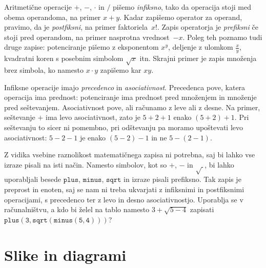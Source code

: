 Aritmetične operacije $+$, $-$, $\cdot$ in $/$ pišemo \emph{infiksno}, tako da operacija
stoji med obema operandoma, na primer $x + y$. Kadar zapišemo operator za operand,
pravimo, da je \emph{postfiksni}, na primer faktoriela~$x!$. Zapis operatorja je
\emph{prefiksni} če stoji pred operandom, na primer nasprotna vrednost~$-x$. Poleg teh
poznamo tudi druge zapise: potenciranje pišemo z eksponentom $x^y$, deljenje z ulomkom
$\frac{x}{y}$, kvadratni koren s posebnim simbolom $\sqrt{x}$ itn. Skrajni primer je zapis
množenja brez simbola, ko namesto $x \cdot y$ zapišemo kar $x y$. 

Infiksne operacije imajo \emph{precedenco} in \emph{asociativnost}. Precedenca pove,
katera operacija ima prednost: potenciranje ima prednost pred množenjem in množenje pred
seštevanjem. Asociativnost pove, ali računamo z leve ali z desne. Na primer, seštevanje
$+$ ima levo asociativnost, zato je $5 + 2 + 1$ enako $(5 + 2) + 1$. Pri seštevanju to
sicer ni pomembno, pri odštevanju pa moramo upoštevati levo asociativnost: $5 - 2 - 1$ je
enako $(5 - 2) - 1$ in ne $5 - (2 - 1)$.  

Z vidika vsebine raznolikost matematičnega zapisa ni potrebna, saj bi lahko vse izraze
pisali na isti način. Namesto simbolov, kot so $+$, $-$ in $\sqrt{\ }$, bi lahko uporabljali
besede $\mathtt{plus}$, $\mathtt{minus}$, $\mathtt{sqrt}$ in izraze pisali prefiksno. Tak
zapis je preprost in enoten, saj se nam ni treba ukvarjati z infiksnimi in postfiksnimi
operacijami, s precedenco ter z levo in desno asociativnostjo. Uporablja se v
računalništvu, a kdo bi želel na tablo namesto $3 + \sqrt{5 - 4}$ zapisati
$\mathtt{plus(3, \mathtt{sqrt}(\mathtt{minus}(5, 4)))}$?




\section{Slike in diagrami}
\label{sec:slike-in-diagrami}

